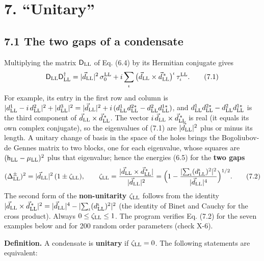 \documentclass[
  10pt,
]{article}
\begin{document}
\hypertarget{unitary}{%
\section{7. ``Unitary''}\label{unitary}}

\hypertarget{the-two-gaps-of-a-condensate}{%
\subsection{7.1 The two gaps of a
condensate}\label{the-two-gaps-of-a-condensate}}

Multiplying the matrix \(\mathsf D_{\rm LL}\) of Eq. (6.4) by its
Hermitian conjugate gives
\[\mathsf D_{\rm LL}\mathsf D_{\rm LL}^\dagger=\lvert\vec d_{\rm LL}\rvert^2\,\sigma^{\rm LL}_0+i\sum_\iota\big(\vec d_{\rm LL}\times\vec d^{\,*}_{\rm LL}\big)^\iota\,\tau^{\rm LL}_\iota . \tag{7.1}\]
For example, its entry in the first row and column is
\(\lvert d^1_{\rm LL}-i\,d^2_{\rm LL}\rvert^2+\lvert d^3_{\rm LL}\rvert^2=\lvert\vec d_{\rm LL}\rvert^2+i\,(d^1_{\rm LL}d^{2*}_{\rm LL}-d^2_{\rm LL}d^{1*}_{\rm LL})\),
and \(d^1_{\rm LL}d^{2*}_{\rm LL}-d^2_{\rm LL}d^{1*}_{\rm LL}\) is the
third component of \(\vec d_{\rm LL}\times\vec d^{\,*}_{\rm LL}\). The
vector \(i\,\vec d_{\rm LL}\times\vec d^{\,*}_{\rm LL}\) is real (it
equals its own complex conjugate), so the eigenvalues of (7.1) are
\(\lvert\vec d_{\rm LL}\rvert^2\) plus or minus its length. A unitary
change of basis in the space of the holes brings the Bogoliubov-de
Gennes matrix to two blocks, one for each eigenvalue, whose squares are
\((\mathsf h_{\rm LL}-\mu_{\rm LL})^2\) plus that eigenvalue; hence the
energies (6.5) for the \textbf{two gaps}
\[(\Delta^\pm_{\rm LL})^2=\lvert\vec d_{\rm LL}\rvert^2\,(1\pm\zeta_{\rm LL}),\qquad\zeta_{\rm LL}=\frac{\lvert\vec d_{\rm LL}\times\vec d^{\,*}_{\rm LL}\rvert}{\lvert\vec d_{\rm LL}\rvert^2}=\Big(1-\frac{\lvert\sum_\iota(d^\iota_{\rm LL})^2\rvert^2}{\lvert\vec d_{\rm LL}\rvert^4}\Big)^{1/2}. \tag{7.2}\]
The second form of the \textbf{non-unitarity} \(\zeta_{\rm LL}\) follows
from the identity
\(\lvert\vec d_{\rm LL}\times\vec d^{\,*}_{\rm LL}\rvert^2=\lvert\vec d_{\rm LL}\rvert^4-\lvert\sum_\iota(d^\iota_{\rm LL})^2\rvert^2\)
(the identity of Binet and Cauchy for the cross product). Always
\(0\le\zeta_{\rm LL}\le1\). The program verifies Eq. (7.2) for the seven
examples below and for 200 random order parameters (check X-6).

\textbf{Definition.} A condensate is \textbf{unitary} if
\(\zeta_{\rm LL}=0\). The following statements are equivalent:
\end{document}
